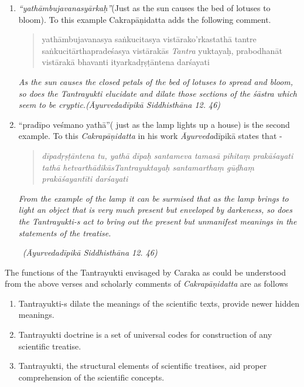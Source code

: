 \begin{enumerate}
\item 
 \textit{“yathāmbujavanasyārkaḥ”}(Just as the sun causes the bed of lotuses to bloom). To this example Cakrapāṇidatta adds the following comment.

\begin{quote}
yathāmbujavanasya saṅkucitasya vistārako'rkastathā tantre saṅkucitārthapradeśasya vistārakās \textit{Tantra} yuktayaḥ, prabodhanāt vistārakā bhavanti ityarkadṛṣṭāntena darśayati
\end{quote}

\begin{myquote}
\textit{As the sun causes the closed petals of the bed of lotuses to spread and bloom, so does the Tantrayukti elucidate and dilate those sections of the śāstra which seem to be cryptic.}\hfill \textit{(Āyurvedadīpikā Siddhisthāna 12. 46)}
\end{myquote}


 \item 
 “pradīpo veśmano yathā”( just as the lamp lights up a house) is the second example. To this \textit{Cakrapāṇidatta} in his work \textit{Āyurveda}dīpikā states that -

\begin{quote}
\textit{dīpadṛṣṭāntena tu, yathā dīpaḥ santameva tamasā pihitaṃ prakāśayati tathā hetvarthādikāsTantrayuktayaḥ santa\-marthaṃ gūḍhaṃ prakāśayantīti darśayati}
\end{quote}

\begin{myquote}
\textit{From the example of the lamp it can be surmised that as the lamp brings to light an object that is very much present but enveloped by darkeness, so does the Tantrayukti-s act to bring out the present but unmanifest meanings in the statements of the treatise.}

~\hfill \textit{(Āyurvedadīpikā Siddhisthāna 12. 46)}
\end{myquote}


\end{enumerate}

The functions of the Tantrayukti envisaged by Caraka as could be understood from the above verses and scholarly comments of \textit{Cakrapāṇidatta} are as follows

\begin{enumerate}[{\rm a.}]
\itemsep=0pt
\item Tantrayukti-s dilate the meanings of the scientific texts, provide newer hidden meanings.

 \item Tantrayukti doctrine is a set of universal codes for construction of any scientific treatise.

 \item Tantrayukti, the structural elements of scientific treatises, aid proper comprehension of the scientific concepts.

\end{enumerate}

